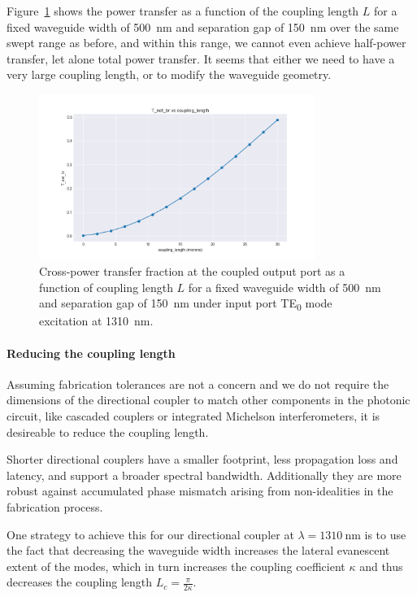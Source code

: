 \documentclass[10pt, a4paper]{article}
\begin{document}
Figure~\ref{fig:coupling_length_1310} shows the power transfer as a function of the coupling length \(L\) for a fixed waveguide width of \SI{500}{\nm} and separation gap of \SI{150}{\nm} over the same swept range as before,
and within this range, we cannot even achieve half-power transfer,
let alone total power transfer. It seems that either we need to have a very large coupling length,
or to modify the waveguide geometry.

\begin{figure}[h!]
  \centering
  \includegraphics[width=0.8\textwidth]{task3/sweep_plots/sweep_idx_1_sweep__coupling_length=0_30_15,_center_wavelength=1.31_T_net_br_line.png}
  \caption{Cross-power transfer fraction at the coupled output port as a function of coupling length \(L\) for a fixed waveguide width of \SI{500}{\nm} and separation gap of \SI{150}{\nm} under input port TE\textsubscript{0} mode excitation at \SI{1310}{\nm}.}
  \label{fig:coupling_length_1310}
\end{figure}

\paragraph{Reducing the coupling length}
Assuming fabrication tolerances are not a concern
and we do not require the dimensions of the directional coupler to match other components in the photonic circuit, like cascaded couplers or integrated Michelson interferometers, it is desireable to reduce the coupling length.

Shorter directional couplers have a smaller footprint,
less propagation loss and latency,
and support a broader spectral bandwidth.
Additionally they are more robust against accumulated phase mismatch arising from non-idealities in the fabrication process.

One strategy to achieve this for our directional coupler at \(\lambda=\SI{1310}{\nm}\) is to use the fact that decreasing the waveguide width increases the lateral evanescent extent of the modes, which in turn increases the coupling coefficient \(\kappa\) and thus decreases the coupling length \(L_c = \frac{\pi}{2\kappa}\).
\end{document}
